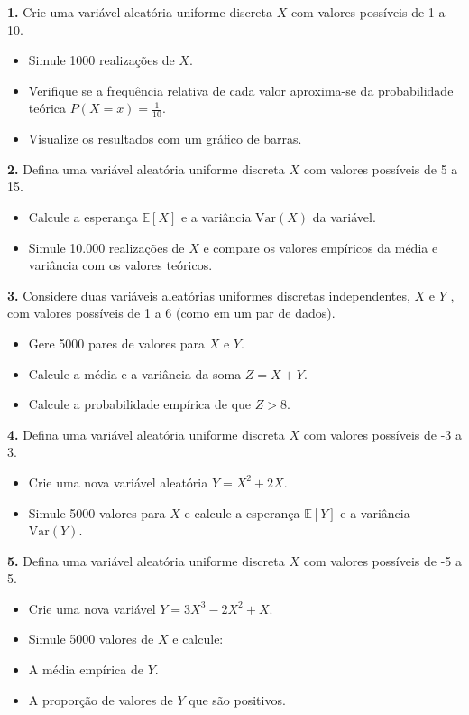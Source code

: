 \documentclass[
]{book}
\providecommand{\tightlist}{%
  \setlength{\itemsep}{0pt}\setlength{\parskip}{0pt}}
\begin{document}
\textbf{1.} Crie uma variável aleatória uniforme discreta \(X\) com valores possíveis de 1 a 10.

\begin{itemize}
\tightlist
\item
  Simule 1000 realizações de \(X\).
\item
  Verifique se a frequência relativa de cada valor aproxima-se da probabilidade teórica \(P(X = x) = \frac{1}{10}\).
\item
  Visualize os resultados com um gráfico de barras.
\end{itemize}

\textbf{2.} Defina uma variável aleatória uniforme discreta \(X\) com valores possíveis de 5 a 15.

\begin{itemize}
\tightlist
\item
  Calcule a esperança \(\mathbb{E}[X]\) e a variância \(\text{Var}(X)\) da variável.
\item
  Simule 10.000 realizações de \(X\) e compare os valores empíricos da média e variância com os valores teóricos.
\end{itemize}

\textbf{3.} Considere duas variáveis aleatórias uniformes discretas independentes, \(X\) e \(Y\) , com valores possíveis de 1 a 6 (como em um par de dados).

\begin{itemize}
\tightlist
\item
  Gere 5000 pares de valores para \(X\) e \(Y\).
\item
  Calcule a média e a variância da soma \(Z = X + Y\).
\item
  Calcule a probabilidade empírica de que \(Z > 8\).
\end{itemize}

\textbf{4.} Defina uma variável aleatória uniforme discreta \(X\) com valores possíveis de -3 a 3.

\begin{itemize}
\tightlist
\item
  Crie uma nova variável aleatória \(Y = X^2 + 2X\).
\item
  Simule 5000 valores para \(X\) e calcule a esperança \(\mathbb{E}[Y]\) e a variância \(\text{Var}(Y)\).
\end{itemize}

\textbf{5.} Defina uma variável aleatória uniforme discreta \(X\) com valores possíveis de -5 a 5.

\begin{itemize}
\tightlist
\item
  Crie uma nova variável \(Y = 3X^3 - 2X^2 + X\).
\item
  Simule 5000 valores de \(X\) e calcule:
\item
  A média empírica de \(Y\).
\item
  A proporção de valores de \(Y\) que são positivos.
\end{itemize}
\end{document}
